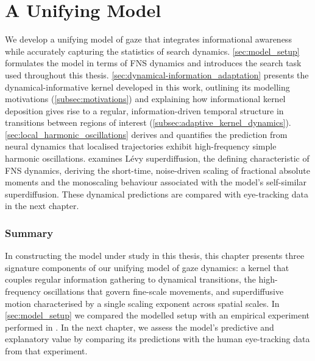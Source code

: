 \chapter{A Unifying Model}\label{chap:a_unifying_model}
We develop a unifying model of gaze that integrates informational awareness while accurately capturing the statistics of search dynamics. \cref{sec:model_setup} formulates the model in terms of FNS dynamics and introduces the search task used throughout this thesis. \cref{sec:dynamical-information_adaptation} presents the dynamical-informative kernel developed in this work, outlining its modelling motivations (\cref{subsec:motivations}) and explaining how informational kernel deposition gives rise to a regular, information-driven temporal structure in transitions between regions of interest (\cref{subsec:adaptive_kernel_dynamics}). \cref{sec:local_harmonic_oscillations} derives and quantifies the prediction from neural dynamics that localised trajectories exhibit high-frequency simple harmonic oscillations.  examines Lévy superdiffusion, the defining characteristic of FNS dynamics, deriving the short-time, noise-driven scaling of fractional absolute moments and the monoscaling behaviour associated with the model’s self-similar superdiffusion. These dynamical predictions are compared with eye-tracking data in the next chapter.









\subsection*{Summary}
In constructing the model under study in this thesis, this chapter presents three signature components of our unifying model of gaze dynamics: a kernel that couples regular information gathering to dynamical transitions, the high-frequency oscillations that govern fine-scale movements, and superdiffusive motion characterised by a single scaling exponent across spatial scales. In \cref{sec:model_setup} we compared the modelled setup with an empirical experiment performed in \cite{naher_primate_saccades}. In the next chapter, we assess the model’s predictive and explanatory value by comparing its predictions with the human eye-tracking data from that experiment.